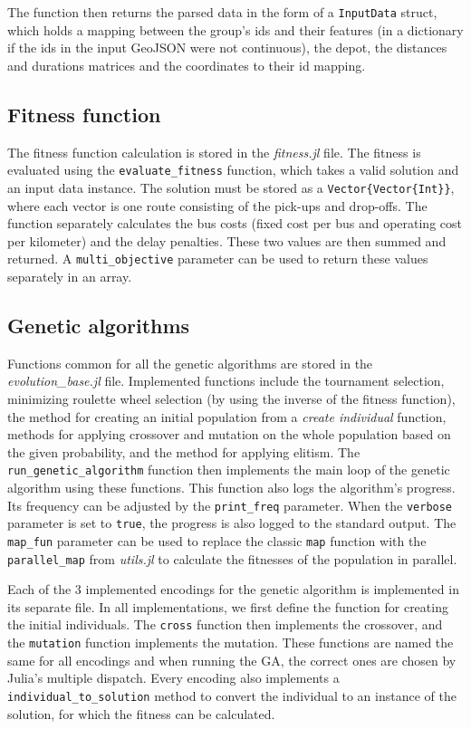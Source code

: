 The function then returns the parsed data in the form of a \texttt{InputData} struct, which holds a mapping between the group's ids and their features (in a dictionary if the ids in the input GeoJSON were not continuous), the depot, the distances and durations matrices and the coordinates to their id mapping.

\subsection{Fitness function}

The fitness function calculation is stored in the \textit{fitness.jl} file. The fitness is evaluated using the \texttt{evaluate\_fitness} function, which takes a valid solution and an input data instance. The solution must be stored as a \texttt{Vector\{Vector\{Int\}\}}, where each vector is one route consisting of the pick-ups and drop-offs. The function separately calculates the bus costs (fixed cost per bus and operating cost per kilometer) and the delay penalties. These two values are then summed and returned. A \texttt{multi\_objective} parameter can be used to return these values separately in an array.

\subsection{Genetic algorithms}

Functions common for all the genetic algorithms are stored in the \textit{evolution\_base.jl} file. Implemented functions include the tournament selection, minimizing roulette wheel selection (by using the inverse of the fitness function), the method for creating an initial population from a \textit{create individual} function, methods for applying crossover and mutation on the whole population based on the given probability, and the method for applying elitism. The \texttt{run\_genetic\_algorithm} function then implements the main loop of the genetic algorithm using these functions. This function also logs the algorithm's progress. Its frequency can be adjusted by the \texttt{print\_freq} parameter. When the \texttt{verbose} parameter is set to \texttt{true}, the progress is also logged to the standard output. The \texttt{map\_fun} parameter can be used to replace the classic \texttt{map} function with the \texttt{parallel\_map} from \textit{utils.jl} to calculate the fitnesses of the population in parallel. 

Each of the 3 implemented encodings for the genetic algorithm is implemented in its separate file. In all implementations, we first define the function for creating the initial individuals. The \texttt{cross} function then implements the crossover, and the \texttt{mutation} function implements the mutation. These functions are named the same for all encodings and when running the GA, the correct ones are chosen by Julia's multiple dispatch. Every encoding also implements a \texttt{individual\_to\_solution} method to convert the individual to an instance of the solution, for which the fitness can be calculated.

